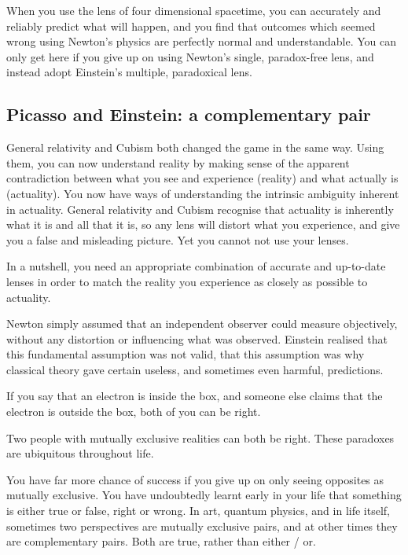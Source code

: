 When you use the lens of four dimensional spacetime, you can accurately and reliably predict what will happen, and you find that outcomes which seemed wrong using Newton's physics are perfectly normal and understandable. You can only get here if you give up on using Newton's single, paradox-free lens, and instead adopt Einstein's multiple, paradoxical lens.


\subsection{Picasso and Einstein: a complementary pair}
\label{section:reality-actuality}
General relativity and Cubism both changed the game in the same way. Using them, you can now understand reality by making sense of the apparent contradiction between what you see and experience (reality) and what actually is (actuality). You now have ways of understanding the intrinsic ambiguity inherent in actuality. General relativity and Cubism recognise that actuality is inherently what it is and all that it is, so any lens will distort what you experience, and give you a false and misleading picture. Yet you cannot not use your lenses.


In a nutshell, you need an appropriate combination of accurate and up-to-date lenses in order to match the reality you experience as closely as possible to actuality.


Newton simply assumed that an independent observer could measure objectively, without any distortion or influencing what was observed. Einstein realised that this fundamental assumption was not valid, that this assumption was why classical theory gave certain useless, and sometimes even harmful, predictions. 


If you say that an electron is inside the box, and someone else claims that the electron is outside the box, both of you can be right. 


Two people with mutually exclusive realities can both be right. These paradoxes are ubiquitous throughout life. 


You have far more chance of success if you give up on only seeing opposites as mutually exclusive. You have undoubtedly learnt early in your life that something is either true or false, right or wrong. In art, quantum physics, and in life itself, sometimes two perspectives are mutually exclusive pairs, and at other times they are complementary pairs. Both are true, rather than either / or. 


